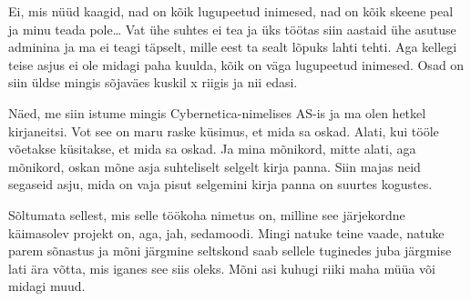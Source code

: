 
Ei, mis nüüd kaagid, nad on kõik lugupeetud inimesed, nad on kõik skeene peal 
ja minu teada pole\ldots {} Vat ühe suhtes ei tea ja üks töötas siin aastaid 
ühe asutuse adminina  ja ma ei teagi täpselt, mille eest ta sealt lõpuks lahti 
tehti. Aga kellegi teise asjus ei ole midagi paha kuulda, kõik on väga 
lugupeetud inimesed. Osad on siin üldse mingis sõjaväes kuskil x riigis ja nii 
edasi. 


Näed, me siin istume mingis Cybernetica-nimelises AS-is ja 
ma olen hetkel kirjaneitsi. Vot see on maru raske küsimus, et mida sa oskad. 
Alati, kui tööle võetakse küsitakse, et mida sa oskad. Ja mina mõnikord, mitte 
alati, aga mõnikord, oskan mõne asja suhteliselt selgelt kirja panna. Siin 
majas neid segaseid asju, mida on vaja pisut selgemini kirja panna on suurtes 
kogustes. 


Sõltumata sellest, mis selle töökoha nimetus on, milline see järjekordne 
käimasolev projekt on, aga, jah, sedamoodi. Mingi natuke teine vaade, natuke 
parem sõnastus ja mõni järgmine seltskond saab sellele tuginedes juba järgmise 
lati ära võtta, mis iganes see siis oleks. Mõni asi kuhugi riiki maha müüa või 
midagi muud. 